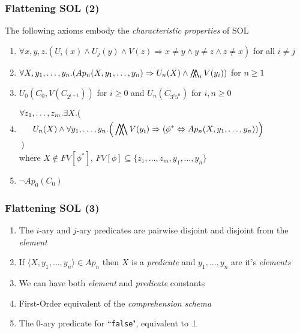 \documentclass{beamer}
\newcommand{\bigdoublewedge}{
  \mathop{
    \mathchoice{\bigwedge\mkern-15mu\bigwedge}
               {\bigwedge\mkern-12.5mu\bigwedge}
               {\bigwedge\mkern-12.5mu\bigwedge}
               {\bigwedge\mkern-11mu\bigwedge}
    }
}
\begin{document}
                \begin{frame}
                    \frametitle{Flattening SOL (2)}
                    The following axioms embody the \textit{characteristic properties} of SOL
                    \vspace*{.5cm}
                    \begin{enumerate}
                        \item $ \forall x, y, z.(U_i(x) \wedge U_j(y) \wedge V(z) \Rightarrow x \neq y \wedge y \neq z \wedge z \neq x) $ for all $ i \neq j $
                        \item $ \forall X, y_1, \dots, y_n.(Ap_n(X, y_1, \dots, y_n) \Rightarrow U_n(X) \wedge \bigdoublewedge_i V(y_i)) $ for $ n \geq 1 $
                        \item $ U_0(C_0, V(C_{2^{i + 1}})) $ for $ i \geq 0 $ and $ U_n(C_{3^i5^n}) $ for $ i, n \geq 0 $
                        \item $ \begin{aligned}
                            \forall &z_1, \dots, z_m. \exists X.(\\
                            &\quad U_n(X) \wedge \forall y_1, \dots, y_n. \Big (\bigdoublewedge V(y_i) \Rightarrow (\phi^* \Leftrightarrow Ap_n(X, y_1, \dots, y_n))\Big )\\
                            ) \end{aligned} $ \\[-1\baselineskip]\quad where $ X \not\in FV[\phi^*] $, $ FV[\phi] \subseteq \{ z_1, \dots, z_m, y_1, \dots, y_n \} $
                        \item $ \neg Ap_0(C_0) $
                    \end{enumerate}
                \end{frame}

                \begin{frame}
                    \frametitle{Flattening SOL (3)}
                    \begin{enumerate}
                        \item The $ i $-ary and $ j $-ary predicates are pairwise disjoint and disjoint from the \textit{element}
                        \item If $ \langle X, y_1, \dots, y_n \rangle \in Ap_n $ then $ X $ is a \textit{predicate} and $ y_1, \dots, y_n $ are it's \textit{elements}
                        \item We can have both \textit{element} and \textit{predicate} constants
                        \item First-Order equivalent of the \textit{comprehension schema}
                        \item The 0-ary predicate for ``\texttt{false}", equivalent to $ \bot $
                    \end{enumerate}
                \end{frame}
\end{document}
